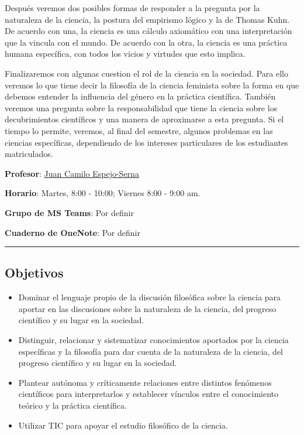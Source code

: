 \documentclass[spanish,]{article}
\begin{document}
Después veremos dos posibles formas de responder a la pregunta por la
naturaleza de la ciencia, la postura del empirismo lógico y la de Thomas
Kuhn. De acuerdo con una, la ciencia es una cálculo axiomático con una
interpretación que la vincula con el mundo. De acuerdo con la otra, la
ciencia es una práctica humana específica, con todos los vicios y
virtudes que esto implica.

Finalizaremos con algunas cuestion el rol de la ciencia en la sociedad.
Para ello veremos lo que tiene decir la filosofía de la ciencia
feminista sobre la forma en que debemos entender la influencia del
género en la práctica científica. También veremos una pregunta sobre la
responsabilidad que tiene la ciencia sobre los decubrimientos
científicos y una manera de aproximarse a esta pregunta. Si el tiempo lo
permite, veremos, al final del semestre, algunos problemas en las
ciencias específicas, dependiendo de los intereses particulares de los
estudiantes matriculados.

\textbf{Profesor}: \href{../index.html}{Juan Camilo Espejo-Serna}~

\textbf{Horario}: Martes, 8:00 - 10:00; Viernes 8:00 - 9:00 am.

\textbf{Grupo de MS Teams}: Por definir

\textbf{Cuaderno de OneNote}: Por definir

\begin{center}\rule{0.5\linewidth}{\linethickness}\end{center}

\subsection{Objetivos}\label{objetivos}

\begin{itemize}
\item
  Dominar el lenguaje propio de la discusión filosófica sobre la ciencia
  para aportar en las discusiones sobre la naturaleza de la ciencia, del
  progreso científico y su lugar en la sociedad.
\item
  Distinguir, relacionar y sistematizar conocimientos aportados por la
  ciencia específicas y la filosofía para dar cuenta de la naturaleza de
  la ciencia, del progreso científico y su lugar en la sociedad.
\item
  Plantear autónoma y críticamente relaciones entre distintos fenómenos
  científicos para interpretarlos y establecer vínculos entre el
  conocimiento teórico y la práctica científica.
\item
  Utilizar TIC para apoyar el estudio filosófico de la ciencia.
\end{itemize}
\end{document}
